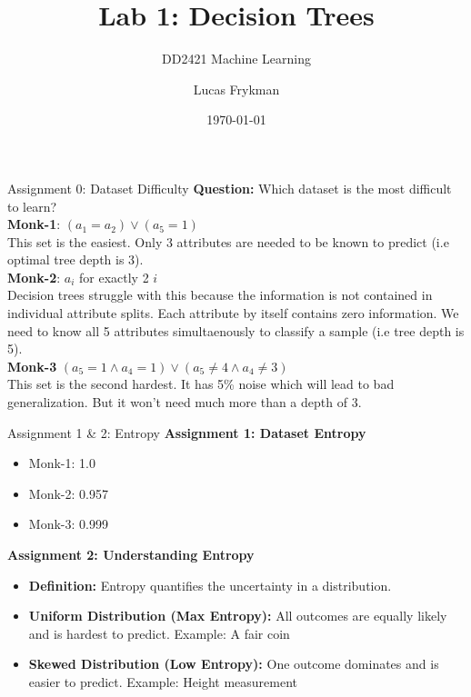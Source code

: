\documentclass{beamer}
\title{Lab 1: Decision Trees}
\subtitle{DD2421 Machine Learning}
\author{Lucas Frykman}
\date{\today}
\begin{document}
\begin{frame}
    \titlepage
\end{frame}

\begin{frame}{Assignment 0: Dataset Difficulty}
    \textbf{Question:} Which dataset is the most difficult to learn? \\
    \textbf{Monk-1}: $(a_1=a_2)\lor(a_5=1)$ \\
    This set is the easiest. Only 3 attributes are needed to be known to predict (i.e optimal
    tree depth is 3).
    \\ \textbf{Monk-2}: $a_i$ for exactly 2 $i$ \\
    Decision trees struggle with this because the information 
    is not contained in individual attribute splits.
    Each attribute by itself contains zero information. 
    We need to know all 5 attributes simultaenously to classify a sample (i.e tree depth is 5).
    \\ \textbf{Monk-3} $(a_5=1\land a_4=1)\lor(a_5 \neq 4 \land a_4 \neq 3)$ \\
    This set is the second hardest. It has 5\% noise which will lead to bad generalization. But it won't need much more than a depth of 3.

\end{frame}

\begin{frame}{Assignment 1 \& 2: Entropy}
    \textbf{Assignment 1: Dataset Entropy}
    \begin{itemize}
        \item Monk-1: 1.0
        \item Monk-2: 0.957
        \item Monk-3: 0.999
    \end{itemize}

    \vspace{1em}
    \textbf{Assignment 2: Understanding Entropy}
    \begin{itemize}
        \item \textbf{Definition:} Entropy quantifies the uncertainty in a distribution.
        \item \textbf{Uniform Distribution (Max Entropy):} All outcomes are equally likely and is hardest to predict. Example: A fair coin
        \item \textbf{Skewed Distribution (Low Entropy):} One outcome dominates and is easier to predict. Example: Height measurement
    \end{itemize}
\end{frame}
\end{document}
